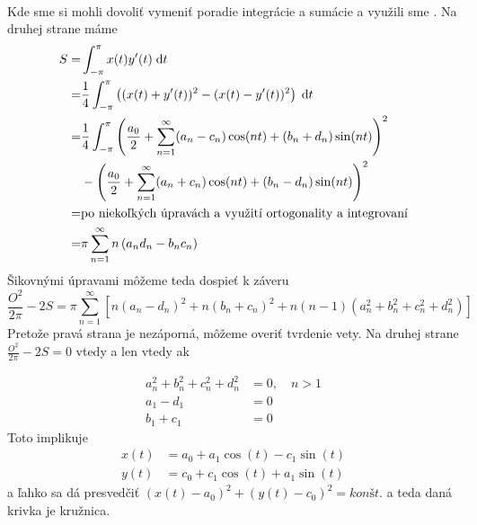 \begin{dokaz}
\begin{equation}
\begin{split}
    \end{split}
    \end{equation}
    Kde sme si mohli dovoliť vymeniť poradie integrácie a sumácie
    a využili sme .
    Na druhej strane máme
    \begin{equation}
    \begin{split}
        S =& \int_{-\pi}^{\pi} x(t) y'(t) \; \mathrm{d} t \\
         =& \frac{1}{4}
            \int_{-\pi}^{\pi} \left(
                    (x(t) + y'(t))^2 - 
                    (x(t) - y'(t))^2 \right) \; \mathrm{d} t \\
         =& \frac{1}{4} \int_{-\pi}^{\pi}
           \left(
            \frac{a_0}{2} + \sum_{n=1}^{\infty}
              (a_n - c_n) \cos(nt) + (b_n + d_n) \sin(nt)
            \right)^2 \\&-
           \left(
            \frac{a_0}{2} + \sum_{n=1}^{\infty}
              (a_n + c_n) \cos(nt) + (b_n - d_n) \sin(nt)
            \right)^2 \\
         =& \text{po niekoľkých úpravách a využití ortogonality a
        integrovaní} \\
         =& \pi \sum_{n=1}^{\infty} n \left( a_n d_n - b_n c_n \right)
    \end{split}
    \end{equation}
    Šikovnými úpravami môžeme teda dospieť k záveru
    \begin{equation}
        \frac{O^2}{2\pi} - 2S = 
         \pi \sum_{n=1}^{\infty} \left[
            n(a_n - d_n)^2 + n (b_n+c_n)^2 + n(n-1)(a_n^2 + b_n^2 +c_n
            ^2 + d_n ^2)
         \right]
    \end{equation}
    Pretože pravá strana je nezáporná, môžeme overiť tvrdenie vety.
    Na druhej strane 
    $\frac{O^2}{2\pi} - 2S = 0$ vtedy a len vtedy ak
    
    \begin{align}
        a_n^2 + b_n^2 + c_n^2 + d_n^2 &= 0, \quad n>1 \\
        a_1 - d_1 &=0 \\
        b_1 + c_1 &=0
    \end{align}
    Toto implikuje
    \begin{align}
        x(t) &= a_0  + a_1 \cos(t) - c_1 \sin(t) \\
        y(t) &= c_0  + c_1 \cos(t) + a_1 \sin(t)
    \end{align}
    a ľahko sa dá presvedčiť
    $(x(t)-a_0)^2 + (y(t) - c_0)^2 = konšt.$ a teda daná krivka je
    kružnica.
\end{dokaz}

